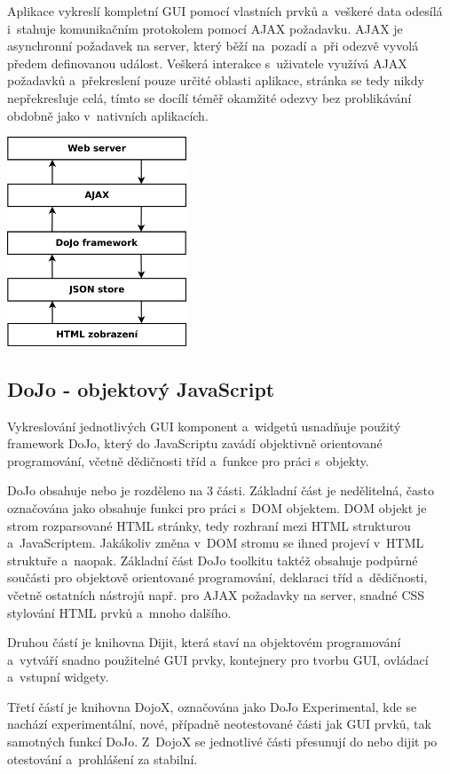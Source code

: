 \documentclass[bc,male,html,dept460]{diploma}				%
\begin{document}
Aplikace vykreslí kompletní GUI pomocí vlastních prvků a~veškeré data odesílá i~stahuje komunikačním protokolem pomocí AJAX požadavku. AJAX je asynchronní požadavek na server, který běží na~pozadí a~při odezvě vyvolá předem definovanou událost.
Veškerá interakce s~uživatele využívá AJAX požadavků a~překreslení pouze určité oblasti aplikace, stránka se tedy nikdy nepřekresluje celá, tímto se docílí téměř okamžité odezvy bez problikávání obdobně jako v~nativních aplikacích.

\bigskip
\includegraphics[width=0.4\textwidth]{../clientArchitecture.png} 


\subsection{DoJo - objektový JavaScript}
Vykreslování jednotlivých GUI komponent a~widgetů usnadňuje použitý framework DoJo, který do JavaScriptu zavádí objektivně orientované programování, včetně dědičnosti tříd a~funkce pro práci s~objekty.

DoJo obsahuje nebo je rozděleno na 3 části. Základní část je nedělitelná, často označována jako  obsahuje funkci pro práci s~DOM objektem. DOM objekt je strom rozparsované HTML stránky, tedy rozhraní mezi HTML strukturou a~JavaScriptem. Jakákoliv změna v~DOM stromu se ihned projeví v~HTML struktuře a~naopak. Základní část DoJo toolkitu taktéž obsahuje podpůrné součásti pro objektově orientované programování, deklaraci tříd a~dědičnosti, včetně ostatních nástrojů např. pro AJAX požadavky na server, snadné CSS stylování HTML prvků a~mnoho dalšího.

Druhou částí je knihovna Dijit, která staví na objektovém programování a~vytváří snadno použitelné GUI prvky, kontejnery pro tvorbu GUI, ovládací a~vstupní widgety. 

Třetí částí je knihovna DojoX, označována jako DoJo Experimental, kde se nachází experimentální, nové, případně neotestované části jak GUI prvků, tak samotných funkcí DoJo. Z~DojoX se jednotlivé části přesunují do  nebo dijit po otestování a~prohlášení za stabilní. 
\end{document}
